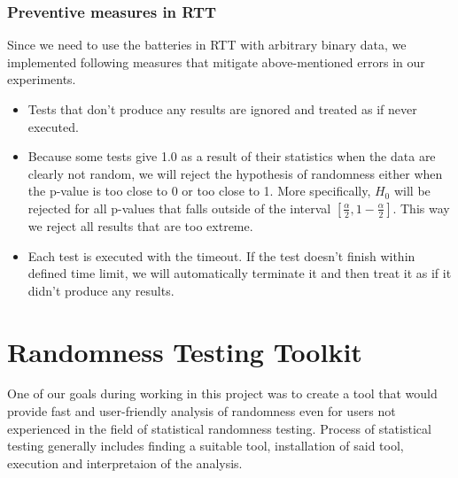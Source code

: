 \documentclass[
  digital,  	%
  color,		%
  oneside,   	%
  12pt,
  nocover,
  notable,
  nolof,
  nolot,
]{fithesis3}
\begin{document}
\subsection{Preventive measures in RTT}
Since we need to use the batteries in RTT with arbitrary binary data, we implemented following measures that mitigate above-mentioned errors in our experiments.
\begin{itemize}
\item Tests that don't produce any results are ignored and treated as if never executed.
\item Because some tests give 1.0 as a result of their statistics when the data are clearly not random, we will reject the hypothesis of randomness either when the p-value is too close to 0 or too close to 1. More specifically, $H_0$ will be rejected for all p-values that falls outside of the interval $\left[\frac{\alpha}{2}, 1-\frac{\alpha}{2}\right]$. This way we reject all results that are too extreme.
\item Each test is executed with the timeout. If the test doesn't finish within defined time limit, we will automatically terminate it and then treat it as if it didn't produce any results.
\end{itemize}

\chapter{Randomness Testing Toolkit}
One of our goals during working in this project was to create a tool that would provide fast and user-friendly analysis of randomness even for users not experienced in the field of statistical randomness testing. Process of statistical testing generally includes finding a suitable tool, installation of said tool, execution and interpretaion of the analysis.
\end{document}
